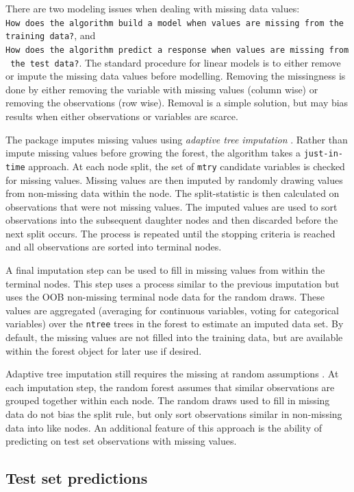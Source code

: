 \documentclass[article]{jss}
\begin{document}
There are two modeling issues when dealing with missing data values:
\texttt{How\ does\ the\ algorithm\ build\ a\ model\ when\ values\ are\ missing\ from\ the\ training\ data?},
and
\texttt{How\ does\ the\ algorithm\ predict\ a\ response\ when\ values\ are\ missing\ from\ the\ test\ data?}.
The standard procedure for linear models is to either remove or impute
the missing data values before modelling. Removing the missingness is
done by either removing the variable with missing values (column wise)
or removing the observations (row wise). Removal is a simple solution,
but may bias results when either observations or variables are scarce.

The  package imputes missing values using
\emph{adaptive tree imputation} \citep{Ishwaran:2008}. Rather than
impute missing values before growing the forest, the algorithm takes a
\texttt{just-in-time} approach. At each node split, the set of
\texttt{mtry} candidate variables is checked for missing values. Missing
values are then imputed by randomly drawing values from non-missing data
within the node. The split-statistic is then calculated on observations
that were not missing values. The imputed values are used to sort
observations into the subsequent daughter nodes and then discarded
before the next split occurs. The process is repeated until the stopping
criteria is reached and all observations are sorted into terminal nodes.

A final imputation step can be used to fill in missing values from
within the terminal nodes. This step uses a process similar to the
previous imputation but uses the OOB non-missing terminal node data for
the random draws. These values are aggregated (averaging for continuous
variables, voting for categorical variables) over the \texttt{ntree}
trees in the forest to estimate an imputed data set. By default, the
missing values are not filled into the training data, but are available
within the forest object for later use if desired.

Adaptive tree imputation still requires the missing at random
assumptions \citep{Rubin:1976}. At each imputation step, the random
forest assumes that similar observations are grouped together within
each node. The random draws used to fill in missing data do not bias the
split rule, but only sort observations similar in non-missing data into
like nodes. An additional feature of this approach is the ability of
predicting on test set observations with missing values.

\subsection{Test set predictions}\label{test-set-predictions}
\end{document}
